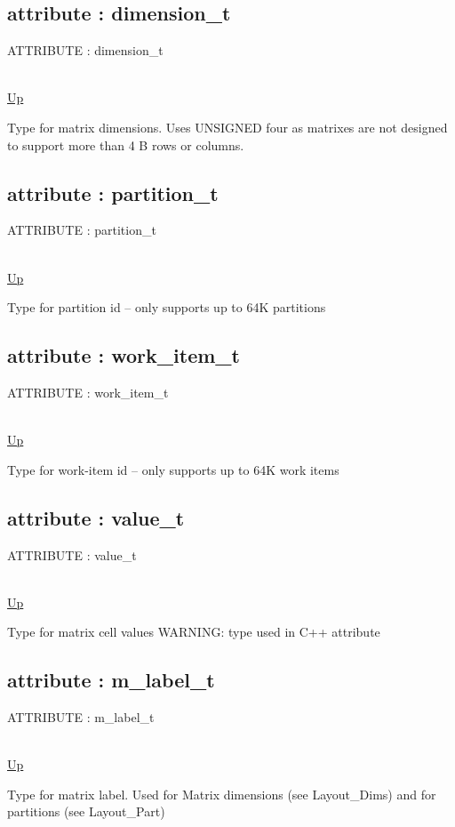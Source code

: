 \subsection*{attribute : dimension\_t}
\hypertarget{ecldoc:pbblas.types.dimension_t}{ATTRIBUTE : dimension\_t} \\
\hyperlink{ecldoc:PBblas.Types}{Up} \\
\par
Type for matrix dimensions. Uses UNSIGNED four as matrixes are not designed to support more than 4 B rows or columns. \\
\subsection*{attribute : partition\_t}
\hypertarget{ecldoc:pbblas.types.partition_t}{ATTRIBUTE : partition\_t} \\
\hyperlink{ecldoc:PBblas.Types}{Up} \\
\par
Type for partition id -- only supports up to 64K partitions \\
\subsection*{attribute : work\_item\_t}
\hypertarget{ecldoc:pbblas.types.work_item_t}{ATTRIBUTE : work\_item\_t} \\
\hyperlink{ecldoc:PBblas.Types}{Up} \\
\par
Type for work-item id -- only supports up to 64K work items \\
\subsection*{attribute : value\_t}
\hypertarget{ecldoc:pbblas.types.value_t}{ATTRIBUTE : value\_t} \\
\hyperlink{ecldoc:PBblas.Types}{Up} \\
\par
Type for matrix cell values WARNING: type used in C++ attribute \\
\subsection*{attribute : m\_label\_t}
\hypertarget{ecldoc:pbblas.types.m_label_t}{ATTRIBUTE : m\_label\_t} \\
\hyperlink{ecldoc:PBblas.Types}{Up} \\
\par
Type for matrix label. Used for Matrix dimensions (see Layout\_Dims) and for partitions (see Layout\_Part) \\
